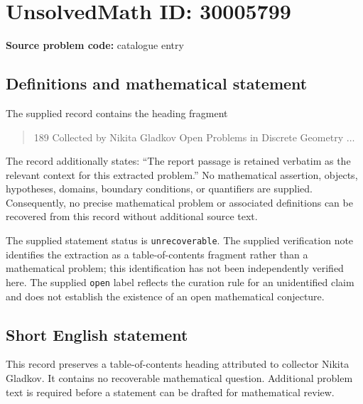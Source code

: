 \documentclass[11pt]{article}
\begin{document}
\section*{UnsolvedMath ID: 30005799}
\textbf{Source problem code:} catalogue entry
\subsection{Definitions and mathematical statement}
The supplied record contains the heading fragment
\begin{quote}
189 Collected by Nikita Gladkov Open Problems in Discrete Geometry \(\ldots\)
\end{quote}
The record additionally states: ``The report passage is retained verbatim as the relevant context for this extracted problem.'' No mathematical assertion, objects, hypotheses, domains, boundary conditions, or quantifiers are supplied. Consequently, no precise mathematical problem or associated definitions can be recovered from this record without additional source text.

The supplied statement status is \texttt{unrecoverable}. The supplied verification note identifies the extraction as a table-of-contents fragment rather than a mathematical problem; this identification has not been independently verified here. The supplied \texttt{open} label reflects the curation rule for an unidentified claim and does not establish the existence of an open mathematical conjecture.
\subsection{Short English statement}
This record preserves a table-of-contents heading attributed to collector Nikita Gladkov. It contains no recoverable mathematical question. Additional problem text is required before a statement can be drafted for mathematical review.
\end{document}
